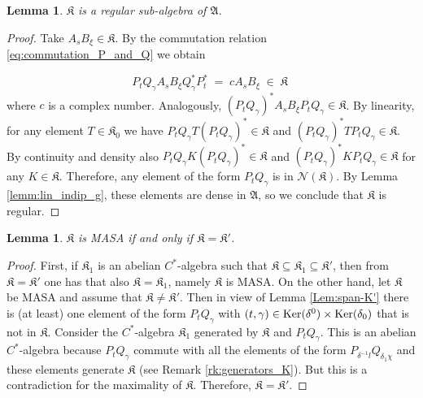 \documentclass[a4paper,12pt,twoside,reqno]{amsart}
\theoremstyle{plain}
\newtheorem{lemma}[teo]{Lemma}
\theoremstyle{definition}
\theoremstyle{remark}
\numberwithin{equation}{section}
\numberwithin{figure}{section}
\numberwithin{table}{section}
\begin{document}
	\begin{lemma}\label{prop:regular}
		$\mathfrak{K}$ is a regular sub-algebra of $\mathfrak{A}$.
	\end{lemma}
	\begin{proof}
		Take $A_sB_\xi\in \mathfrak{K}$. By the commutation relation \eqref{eq:commutation_P_and_Q} we obtain
		
		\begin{equation}
			P_{t}Q_\gamma A_sB_\xi Q_{\gamma}^*P_{t}^*\;=\;c A_sB_\xi\;\in\; \mathfrak{K}\;
		\end{equation}
		where $c$ is a complex number. Analogously, $(P_tQ_\gamma)^*A_sB_\xi P_tQ_\gamma\in\mathfrak{K}$.
		By linearity, for any element $T\in \mathfrak{K}_0$ we have $P_tQ_\gamma T(P_tQ_\gamma)^*\in \mathfrak{K}$ and $(P_tQ_\gamma)^*TP_tQ_\gamma\in \mathfrak{K}$. 
		By continuity and density also $P_tQ_\gamma K(P_tQ_\gamma)^*\in \mathfrak{K}$ and $(P_tQ_\gamma)^*KP_tQ_\gamma\in \mathfrak{K}$ for any $K\in\mathfrak{K}$.	 Therefore, any element of the form $P_tQ_\gamma$ is in $\mathcal{N}(\mathfrak{K})$. By Lemma \ref{lemm:lin_indip_g}, these elements are dense in $\mathfrak{A}$, so we conclude that $\mathfrak{K}$ is regular.
	\end{proof}
	
	
	\begin{lemma}\label{lema:MASA}
		$\mathfrak{K}$ is MASA if and only if $\mathfrak{K}=\mathfrak{K}'$.
	\end{lemma}
	
	\begin{proof} First,  if $\mathfrak{K}_1$ is an abelian $C^*$-algebra such that $\mathfrak{K}\subseteq \mathfrak{K}_1\subseteq \mathfrak{K}'$, then from $\mathfrak{K}=\mathfrak{K'}$ one has that also $\mathfrak{K}=\mathfrak{K}_1$, namely  $\mathfrak{K}$ is MASA.
		On the other hand, let $\mathfrak{K}$ be MASA and assume that $\mathfrak{K}\not=\mathfrak{K}'$. Then in view of Lemma \ref{Lem:span-K'}
		there is (at least) one element of the form $P_tQ_\gamma$ with $(t,\gamma)\in {\rm Ker}(\delta^0)\times {\rm Ker}(\delta_0)$ that is not in $\mathfrak{K}$. 
		Consider the $C^*$-algebra $\mathfrak{K}_1$ generated by $\mathfrak{K}$ and $P_tQ_\gamma$. This is an abelian $C^*$-algebra because $P_tQ_\gamma$ commute with all the elements of the form $P_{\delta^{-1}l}Q_{\delta_1\chi}$ and these elements generate $\mathfrak{K}$ (see Remark \ref{rk:generators_K}). But this is a contradiction for the maximality of $\mathfrak{K}$. Therefore, $\mathfrak{K}=\mathfrak{K'}$.
	\end{proof}
	
\end{document}
